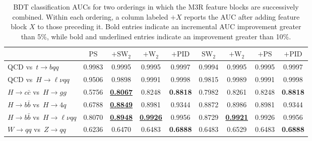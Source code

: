 \begin{table}[h]
  \centering
  \small
  \renewcommand{\arraystretch}{1.15}
  \setlength{\tabcolsep}{4pt}
  \begin{tabular}{@{}|l|c|c|c|c|||c|c|c|c|@{}}
    \hline
    & \(\mathrm{PS}\) & \(+\mathrm{SW}_2\) & \(+\mathrm{W}_2\) & \(+\mathrm{PID}\) & \(\mathrm{SW}_2\) & \(+\mathrm{W}_2\) & \(+\mathrm{PS}\) & \(+\mathrm{PID}\) \\
    \hline
    \(\mathrm{QCD}\) vs\ \(t\to bqq\) & 0.9983 & 0.9995 & 0.9995 & 0.9997 & 0.9994 & 0.9995 & 0.9995 & 0.9997 \\
    \(\mathrm{QCD}\) vs\ \(H \to \ell\nu q q\) & 0.9506 & 0.9898 & 0.9991 & 0.9998 & 0.9815 & 0.9989 & 0.9991 & 0.9998 \\
    \(H \to c\bar{c}\) vs\ \(H \to gg\) & 0.5756 & \textbf{\underline{0.8067}} & 0.8248 & \textbf{0.8818} & 0.7982 & 0.8261 & 0.8248 & \textbf{0.8818} \\
    \(H \to b\bar{b}\) vs\ \(H \to 4q\) & 0.6788 & \textbf{\underline{0.8849}} & 0.8981 & 0.9344 & 0.8872 & 0.8986 & 0.8981 & 0.9344 \\
    \(H \to b\bar{b}\) vs\ \(H \to \ell \nu q q\) & 0.8070 & \textbf{\underline{0.8948}} & \textbf{\underline{0.9926}} & 0.9956 & 0.8729 & \textbf{\underline{0.9921}} & 0.9926 & 0.9956 \\
    \(W \to qq\) vs\ \(Z \to qq\) & 0.6236 & 0.6470 & 0.6483 & \textbf{0.6888} & 0.6483 & 0.6529 & 0.6483 & \textbf{0.6888} \\
    \hline
  \end{tabular}
  \caption{BDT classification AUCs for two orderings in which the M3R feature blocks are successively combined. Within each ordering, a column labeled \(+X\) reports the AUC after adding feature block \(X\) to those preceding it. Bold entries indicate an incremental AUC improvement greater than 5\%, while bold and underlined entries indicate an improvement greater than 10\%.}
  \label{tab:feature_progression}
\end{table}
